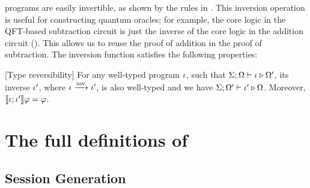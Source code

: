 \oqasm programs are easily invertible, as shown by the rules in .
This inversion operation is useful for constructing quantum oracles; for example, the core logic in the QFT-based subtraction circuit is just the inverse of the core logic in the addition circuit ().
This allows us to reuse the proof of addition in the proof of subtraction.
The inversion function satisfies the following properties:

 \begin{theorem}\label{thm:reversibility}\rm[Type reversibility]
    For any well-typed program $\iota$, such that $\Sigma; \Omega \vdash \iota \triangleright \Omega'$, its inverse $\iota'$, where $\iota \xrightarrow{\text{inv}} \iota'$, is also well-typed and we have $\Sigma;\Omega' \vdash \iota' \triangleright \Omega$. Moreover, $\llbracket \iota ; \iota' \rrbracket \varphi=\varphi$.
 \end{theorem}



\section{The full definitions of \qafny}
\label{sec:qafny-app}


\subsection{\qafny Session Generation}\label{sec:session-gen}


